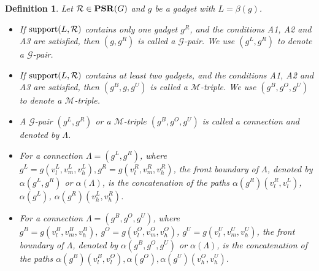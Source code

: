 \documentclass[11pt]{article}
\newcommand{\R}{{\cal R}}
\newcommand{\MM}{\mathcal{M}}
\newcommand{\GG}{\mathcal{G}}
\newcommand{\PSR}{\mathbf{PSR}}
\newtheorem{definition}[figure]{Definition}
\begin{document}
\begin{definition}\label{def:connection}
Let $\R \in \PSR(G)$ and $g$ be a gadget with $L=\beta(g)$.
\begin{itemize}
\item If $\mbox{support}(L, \R)$ contains only one gadget $g^R$, and the
conditions A1, A2 and A3 are satisfied, then $(g, g^R)$ is called a
{\em $\GG$-pair}. We use $(g^L, g^R)$ to denote a $\GG$-pair.

\item If $\mbox{support}(L,\R)$ contains at least two gadgets, and the conditions
A1, A2 and A3 are satisfied, then $(g^B, g, g^U)$ is called a {\em $\MM$-triple}.
We use $(g^B, g^O, g^U)$ to denote a {\em $\MM$-triple}.

\item A $\GG$-pair $(g^L,g^R)$ or a $\MM$-triple $(g^B,g^O,g^U)$ is
called a {\em connection} and denoted by $\Lambda$.

\item For a connection $\Lambda=(g^L, g^R)$,
where $g^L=g(v^L_l, v^L_m, v^L_h), g^R=g(v^R_l, v^R_m, v^R_h)$,
the {\em front boundary} of $\Lambda$, denoted by $\alpha(g^L, g^R)$
or $\alpha(\Lambda)$, is the concatenation of the paths
$\alpha(g^R)(v^R_l, v^L_l)$, $\alpha(g^L)$, $\alpha(g^R)(v^L_h, v^R_h)$.

\item For a connection $\Lambda=(g^B, g^O, g^U)$, where
$g^B=g(v^B_l, v^B_m, v^B_h),~g^O=g(v^O_l, v^O_m, v^O_h)$,
$g^U=g(v^U_l, v^U_m, v^U_h)$, the {\em front boundary} of $\Lambda$, denoted by
$\alpha(g^B, g^O,g^U)$ or $\alpha(\Lambda)$, is the concatenation of the paths
$\alpha(g^B)(v^B_l, v^O_l), \alpha(g^O), \alpha(g^U)(v^O_h, v^U_h)$.
\end{itemize}
\end{definition}
\end{document}
